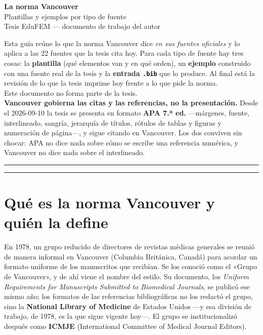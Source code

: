 \documentclass[11pt,a4paper]{article}
\begin{document}
\begin{center}
{\LARGE\bfseries\color{tinta} La norma Vancouver}\\[4pt]
{\large\color{tinta} Plantillas y ejemplos por tipo de fuente}\\[10pt]
{\color{gris} Tesis EduFEM --- documento de trabajo del autor}\\[10pt]
\begin{minipage}{0.9\textwidth}\small
Esta guía reúne lo que la norma Vancouver dice \emph{en sus fuentes oficiales} y lo aplica a
las 22 fuentes que la tesis cita hoy. Para cada tipo de fuente hay tres cosas: la
\textbf{plantilla} (qué elementos van y en qué orden), un \textbf{ejemplo} construido con una
fuente real de la tesis y la \textbf{entrada \texttt{.bib}} que lo produce. Al final está la
revisión de lo que la tesis imprime hoy frente a lo que pide la norma.\\[5pt]
Este documento no forma parte de la tesis.\\[5pt]
\textbf{Vancouver gobierna las citas y las referencias, no la presentación.} Desde el
2026-09-10 la tesis se presenta en formato \textbf{APA 7.ª ed.} ---márgenes, fuente,
interlineado, sangría, jerarquía de títulos, rótulos de tablas y figuras y numeración de
página---, y sigue citando en Vancouver. Los dos conviven sin chocar: APA no dice nada sobre
cómo se escribe una referencia numérica, y Vancouver no dice nada sobre el interlineado.
\end{minipage}
\end{center}
\vspace{6pt}\hrule\vspace{10pt}

{\small\tableofcontents}
\vspace{6pt}\hrule

\section{Qué es la norma Vancouver y quién la define}

En 1978, un grupo reducido de directores de revistas médicas generales se reunió de manera
informal en Vancouver (Columbia Británica, Canadá) para acordar un formato uniforme de los
manuscritos que recibían. Se los conoció como el «Grupo de Vancouver», y de ahí viene el
nombre del estilo. Su documento, los \emph{Uniform Requirements for Manuscripts Submitted to
Biomedical Journals}, se publicó ese mismo año; los formatos de las referencias
bibliográficas no los redactó el grupo, sino la \textbf{National Library of Medicine} de
Estados Unidos ---y esa división de trabajo, de 1978, es la que sigue vigente hoy---. El
grupo se institucionalizó después como \textbf{ICMJE} (International Committee of Medical
Journal Editors).
\end{document}
